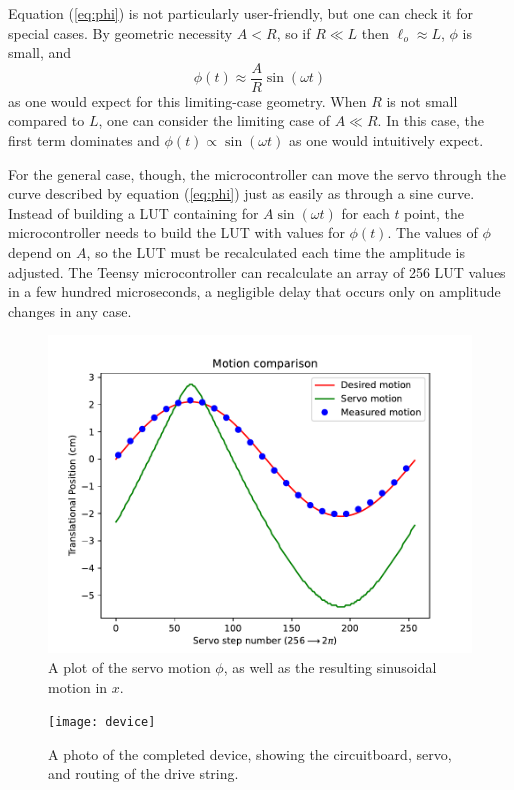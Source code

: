\documentclass[prb,preprint]{revtex4-1}
\begin{document}
Equation (\ref{eq:phi}) is not particularly user-friendly, but one can check it for special cases. 
By geometric necessity $A<R$, so if $R\ll L$ then $\ell_o \approx L$, $\phi$ is small, and 
\begin{equation}
	\phi(t) \approx \frac{A}{R}\sin(\omega t)
\end{equation}
as one would expect for this limiting-case geometry.
When $R$ is not small compared to $L$, one can consider the limiting case of $A \ll R$. 
In this case, the first term dominates and $\phi(t) \propto \sin(\omega t)$ as one would intuitively expect. 

For the general case, though, the microcontroller can move the servo through the curve described by equation (\ref{eq:phi}) just as easily as through a sine curve. 
Instead of building a LUT containing for $A\sin(\omega t)$ for each $t$ point, the microcontroller needs to build the LUT with values for $\phi(t)$.
The values of $\phi$ depend on $A$, so the LUT must be recalculated each time the amplitude is adjusted. 
The Teensy microcontroller can recalculate an array of 256 LUT values in a few hundred microseconds, a negligible delay that occurs only on amplitude changes in any case.

\begin{figure}[ht]
	\begin{center}
		\includegraphics[width=5in]{comparison}
	\end{center}
	\caption{A plot of the servo motion $\phi$, as well as the resulting sinusoidal motion in $x$.}
	\label{fig:motion}
\end{figure}

\begin{figure}[ht]
	\begin{center}
		\texttt{[image: device]}
	\end{center}
	\caption{A photo of the completed device, showing the circuitboard, servo, and routing of the drive string.}
	\label{fig:device}
\end{figure}
\end{document}

